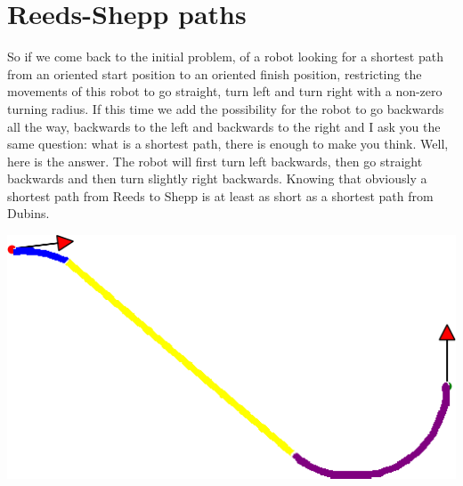 \documentclass[11pt,a4paper]{article}
\begin{document}
	\section{Reeds-Shepp paths}
	
	\begin{minipage}{0.8\textwidth}
	\raggedright
	So if we come back to the initial problem, of a robot looking for a shortest path from an oriented start position to an oriented finish position, restricting the movements of this robot to go straight, turn left and turn right with a non-zero turning radius. If this time we add the possibility for the robot to go backwards all the way, backwards to the left and backwards to the right and I ask you the same question: what is a shortest path, there is enough to make you think.
	Well, here is the answer. The robot will first turn left backwards, then go straight backwards and then turn slightly right backwards. Knowing that obviously a shortest path from Reeds to Shepp is at least as short as a shortest path from Dubins.
	\end{minipage}
	\begin{minipage}{0.2\textwidth}
	\includegraphics[width=\linewidth]{Illustrations/ReedsSheppBeautifulSummary.png}
	\end{minipage}\\
	
\end{document}
